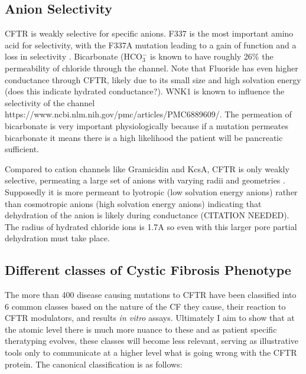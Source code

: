 \subsection {Anion Selectivity}
CFTR is weakly selective for specific anions. F337 is the most important amino acid for selectivity, with the F337A mutation leading to a gain of function and a loss in selectivity \cite{wei2016}. Bicarbonate (HCO$_3^-$ is known to have roughly 26\% the permeability of chloride through the channel. Note that Fluoride has even higher conductance through CFTR, likely due to its small size and high solvation energy (does this indicate hydrated conductance?). WNK1 is known to influence the selectivity of the channel https://www.ncbi.nlm.nih.gov/pmc/articles/PMC6889609/. The permeation of bicarbonate is very important physiologically because if a mutation permeates bicarbonate it means there is a high likelihood the patient will be pancreatic sufficient. 

Compared to cation channels like Gramicidin and KcsA, CFTR is only weakly selective, permeating a large set of anions with varying radii and geometries \cite{}. Supposedly it is more permeant to lyotropic (low solvation energy anions) rather than cosmotropic anions (high solvation energy anions) indicating that dehydration of the anion is likely during conductance (CITATION NEEDED). The radius of hydrated chloride ions is 1.7A \cite{yang2002} so even with this larger pore partial dehydration must take place. 


\subsection{Different classes of Cystic Fibrosis Phenotype}
The more than 400 disease causing mutations to CFTR have been classified into 6 common classes based on the nature of the CF they cause, their reaction to CFTR modulators, and results \textit{in vitro} assays. Ultimately I aim to show that at the atomic level there is much more nuance to these and as patient specific theratyping evolves, these classes will become less relevant, serving as illustrative tools only to communicate at a higher level what is going wrong with the CFTR protein. The canonical classification is as follows:

